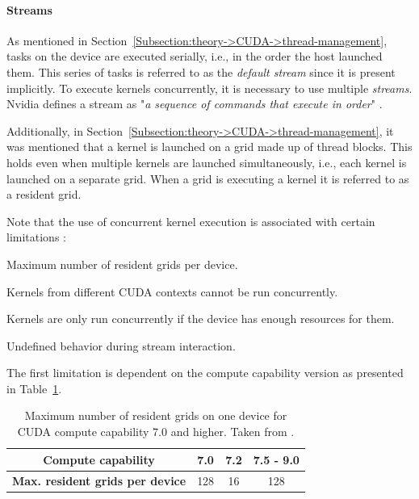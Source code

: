 \paragraph{Streams} As mentioned in Section~\ref{Subsection:theory->CUDA->thread-management}, tasks on the device are executed serially, i.e., in the order the host launched them.
This series of tasks is referred to as the \textit{default stream} since it is present implicitly.
To execute kernels concurrently, it is necessary to use multiple \textit{streams}.
Nvidia defines a stream as "\textit{a sequence of commands that execute in order}" \cite{NVIDIADecember2022}.

Additionally, in Section~\ref{Subsection:theory->CUDA->thread-management}, it was mentioned that a kernel is launched on a grid made up of thread blocks.
This holds even when multiple kernels are launched simultaneously, i.e., each kernel is launched on a separate grid.
When a grid is executing a kernel it is referred to as a resident grid.

Note that the use of concurrent kernel execution is associated with certain limitations \cite{Cejka2022, NVIDIADecember2022}:

\begin{tight_enumerate}
	\item Maximum number of resident grids per device.
	\item Kernels from different CUDA contexts cannot be run concurrently.
	\item Kernels are only run concurrently if the device has enough resources for them.
	\item Undefined behavior during stream interaction.
\end{tight_enumerate}

The first limitation is dependent on the compute capability version as presented in Table~\ref{Table:theory->CUDA->concurrent-kernel-execution->maximum-resident-grids-per-device}.

\begin{table}[ht!]
	\centering
	\begin{tabular}{|c|c|c|c|}
		\hline
		\cellcolor[HTML]{C0C0C0}\textbf{Compute capability}             & 7.0 & 7.2 & 7.5 - 9.0 \\ \hline
		\cellcolor[HTML]{C0C0C0}\textbf{Max. resident grids per device} & 128 & 16  &    128    \\ \hline
	\end{tabular}
	\caption{Maximum number of resident grids on one device for CUDA compute capability 7.0 and higher.
		Taken from  \cite{NVIDIADecember2022}.
	}
	\label{Table:theory->CUDA->concurrent-kernel-execution->maximum-resident-grids-per-device}
\end{table}

